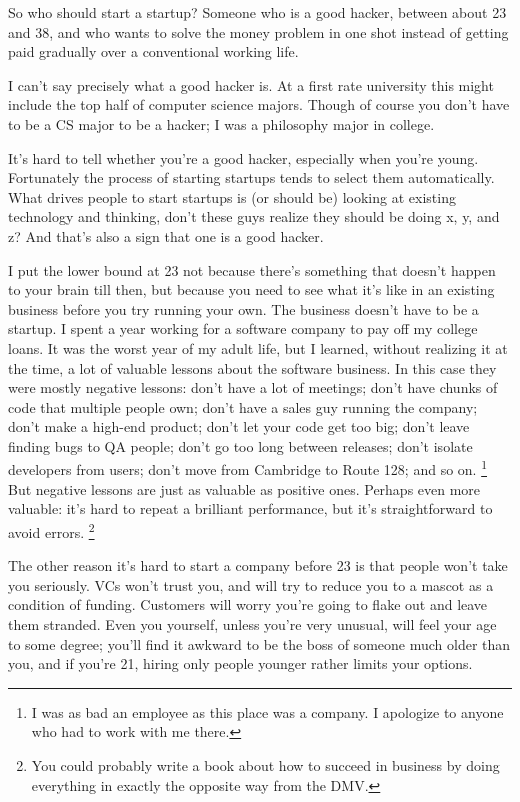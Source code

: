 \documentclass[12pt]{book}
\begin{document}
So who should start a startup? Someone who is a good hacker, between
about 23 and 38, and who wants to solve the money problem in one shot
instead of getting paid gradually over a conventional working life.

I can't say precisely what a good hacker is. At a first rate university
this might include the top half of computer science majors. Though of
course you don't have to be a CS major to be a hacker; I was a
philosophy major in college.

It's hard to tell whether you're a good hacker, especially when you're
young. Fortunately the process of starting startups tends to select them
automatically. What drives people to start startups is (or should be)
looking at existing technology and thinking, don't these guys realize
they should be doing x, y, and z? And that's also a sign that one is a
good hacker.

I put the lower bound at 23 not because there's something that doesn't
happen to your brain till then, but because you need to see what it's
like in an existing business before you try running your own. The
business doesn't have to be a startup. I spent a year working for a
software company to pay off my college loans. It was the worst year of
my adult life, but I learned, without realizing it at the time, a lot of
valuable lessons about the software business. In this case they were
mostly negative lessons: don't have a lot of meetings; don't have chunks
of code that multiple people own; don't have a sales guy running the
company; don't make a high-end product; don't let your code get too big;
don't leave finding bugs to QA people; don't go too long between
releases; don't isolate developers from users; don't move from Cambridge
to Route 128; and so on. \footnote{I was as bad an employee as this place was a company. I
apologize to anyone who had to work with me there.} But negative lessons are just as
valuable as positive ones. Perhaps even more valuable: it's hard to
repeat a brilliant performance, but it's straightforward to avoid
errors. \footnote{You could probably write a book about how to succeed in business
by doing everything in exactly the opposite way from the DMV.}

The other reason it's hard to start a company before 23 is that people
won't take you seriously. VCs won't trust you, and will try to reduce
you to a mascot as a condition of funding. Customers will worry you're
going to flake out and leave them stranded. Even you yourself, unless
you're very unusual, will feel your age to some degree; you'll find it
awkward to be the boss of someone much older than you, and if you're 21,
hiring only people younger rather limits your options.
\end{document}
